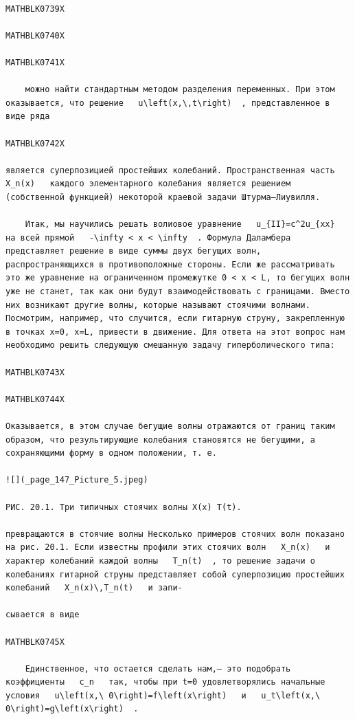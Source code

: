 \documentclass[
]{article}
\begin{document}
\begin{verbatim}

MATHBLK0739X

MATHBLK0740X

MATHBLK0741X

    можно найти стандартным методом разделения переменных. При этом оказывается, что решение   u\left(x,\,t\right)  , представленное в виде ряда

MATHBLK0742X

является суперпозицией простейших колебаний. Пространственная часть   X_n(x)   каждого элементарного колебания является решением (собственной функцией) некоторой краевой задачи Штурма—Лиувилля.

    Итак, мы научились решать волиовое уравнение   u_{II}=c^2u_{xx}   на всей прямой   -\infty < x < \infty  . Формула Даламбера представляет решение в виде суммы двух бегущих волн, распространяющихся в противоположные стороны. Если же рассматривать это же уравнение на ограниченном промежутке 0 < x < L, то бегущих волн уже не станет, так как они будут взаимодействовать с границами. Вместо них возникают другие волны, которые называют стоячими волнами. Посмотрим, например, что случится, если гитарную струну, закрепленную в точках x=0, x=L, привести в движение. Для ответа на этот вопрос нам необходимо решить следующую смешанную задачу гиперболического типа:

MATHBLK0743X

MATHBLK0744X

Оказывается, в этом случае бегущие волны отражаются от границ таким образом, что результирующие колебания становятся не бегущими, а сохраняющими форму в одном положении, т. е.

![](_page_147_Picture_5.jpeg)

РИС. 20.1. Три типичных стоячих волны X(x) T(t).

превращаются в стоячие волны Несколько примеров стоячих волн показано на рис. 20.1. Если известны профили этих стоячих волн   X_n(x)   и характер колебаний каждой волны   T_n(t)  , то решение задачи о колебаниях гитарной струны представляет собой суперпозицию простейших колебаний   X_n(x)\,T_n(t)   и запи-

сывается в виде

MATHBLK0745X

    Единственное, что остается сделать нам,— это подобрать коэффициенты   c_n   так, чтобы при t=0 удовлетворялись начальные условия   u\left(x,\ 0\right)=f\left(x\right)   и   u_t\left(x,\ 0\right)=g\left(x\right)  .


\end{verbatim}
\end{document}

